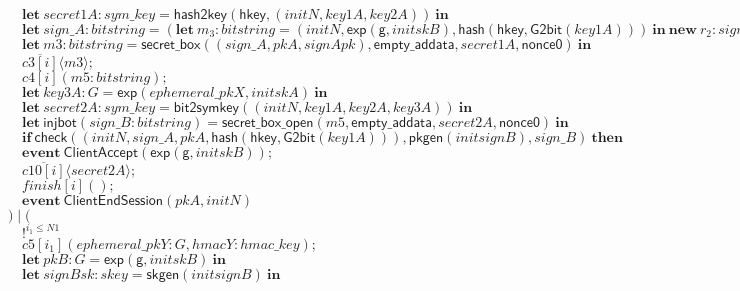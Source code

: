 \documentclass{article}
\newcommand{\cinput}[2]{{#1}({#2})}
\newcommand{\coutput}[2]{\overline{#1}\langle{#2}\rangle}
\newcommand{\kw}[1]{\mathbf{#1}}
\newcommand{\kwf}[1]{\mathsf{#1}}
\newcommand{\var}[1]{\mathit{#1}}
\newcommand{\kwt}[1]{\mathit{#1}}
\newcommand{\kwp}[1]{\mathit{#1}}
\newcommand{\kwc}[1]{\mathit{#1}}
\begin{document}
\begin{tabbing}
\>$\quad \kw{let}\ \var{secret1A}: \kwt{sym{\_}key} = \kwf{hash2key}(\kwf{hkey}, \kwf{}(\var{initN}, \var{key1A}, \var{key2A}))\ \kw{in}$\\
\>$\quad \kw{let}\ \var{sign{\_}A}: \kwt{bitstring} = (\kw{let}\ \var{m}_{3}: \kwt{bitstring} = \kwf{}(\var{initN}, \kwf{exp}(\kwf{g}, \var{initskB}), \kwf{hash}(\kwf{hkey}, \kwf{G2bit}(\var{key1A})))\ \kw{in}\ \kw{new}\ \var{r}_{2}: \kwt{sign{\_}seed};\ \kwf{sign{\_}r}(\var{m}_{3}, \var{signAsk}, \var{r}_{2}))\ \kw{in}$\\
\>$\quad \kw{let}\ \var{m3}: \kwt{bitstring} = \kwf{secret{\_}box}(\kwf{}(\var{sign{\_}A}, \var{pkA}, \var{signApk}), \kwf{empty{\_}addata}, \var{secret1A}, \kwf{nonce0})\ \kw{in}$\\
\>$\quad \coutput{\kwc{c3}[\var{i}]}{\var{m3}};$\\
\>$\quad \cinput{\kwc{c4}[\var{i}]}{\var{m5}: \kwt{bitstring}};$\\
\>$\quad \kw{let}\ \var{key3A}: \kwt{G} = \kwf{exp}(\var{ephemeral{\_}pkX}, \var{initskA})\ \kw{in}$\\
\>$\quad \kw{let}\ \var{secret2A}: \kwt{sym{\_}key} = \kwf{bit2symkey}(\kwf{}(\var{initN}, \var{key1A}, \var{key2A}, \var{key3A}))\ \kw{in}$\\
\>$\quad \kw{let}\ \kwf{injbot}(\var{sign{\_}B}: \kwt{bitstring}) = \kwf{secret{\_}box{\_}open}(\var{m5}, \kwf{empty{\_}addata}, \var{secret2A}, \kwf{nonce0})\ \kw{in}$\\
\>$\quad \kw{if}\ \kwf{check}(\kwf{}(\var{initN}, \var{sign{\_}A}, \var{pkA}, \kwf{hash}(\kwf{hkey}, \kwf{G2bit}(\var{key1A}))), \kwf{pkgen}(\var{initsignB}), \var{sign{\_}B})\ \kw{then}$\\
\>$\quad \kw{event}\ \kwf{ClientAccept}(\kwf{exp}(\kwf{g}, \var{initskB}));$\\
\>$\quad \coutput{\kwc{c10}[\var{i}]}{\var{secret2A}};$\\
\>$\quad \cinput{\kwc{finish}[\var{i}]}{};$\\
\>$\quad \kw{event}\ \kwf{ClientEndSession}(\var{pkA}, \var{initN})$\\
\>$) \mid ($\\
\>$\quad !^{\var{i}_{1} \leq \kwp{N1}}$\\
\>$\quad \cinput{\kwc{c5}[\var{i}_{1}]}{\var{ephemeral{\_}pkY}: \kwt{G}, \var{hmacY}: \kwt{hmac{\_}key}};$\\
\>$\quad \kw{let}\ \var{pkB}: \kwt{G} = \kwf{exp}(\kwf{g}, \var{initskB})\ \kw{in}$\\
\>$\quad \kw{let}\ \var{signBsk}: \kwt{skey} = \kwf{skgen}(\var{initsignB})\ \kw{in}$\\

\end{tabbing}
\end{document}
